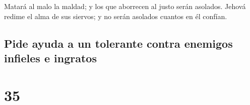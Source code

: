  Matará al malo la maldad; y los que aborrecen al justo
serán asolados.  Jehová redime el alma de sus siervos; y no
serán asolados cuantos en él confían.

\hypertarget{pide-ayuda-a-un-tolerante-contra-enemigos-infieles-e-ingratos}{%
\subsection{Pide ayuda a un tolerante contra enemigos infieles e
ingratos}\label{pide-ayuda-a-un-tolerante-contra-enemigos-infieles-e-ingratos}}

\hypertarget{section-34}{%
\section{35}\label{section-34}}

